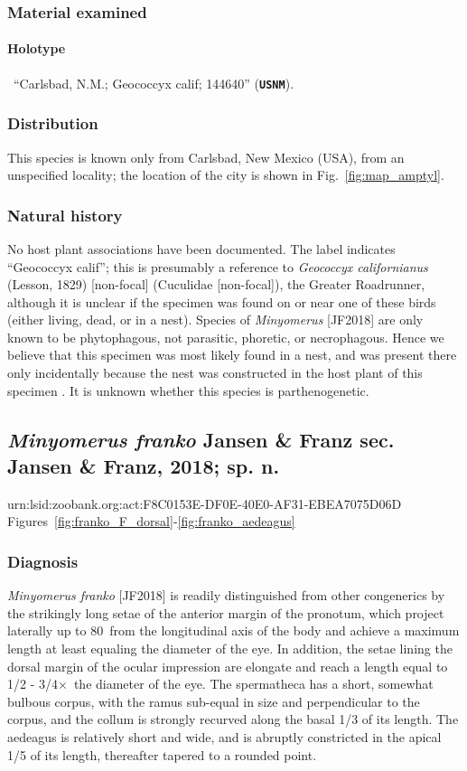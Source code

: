 \documentclass[fleqn,10pt,lineno]{wlpeerj} %
\newcommand{\td}{\textdegree~}
\newcommand{\x}{$\times$~}
\begin{document}
		\subsubsection*{Material examined}
			\paragraph{Holotype}
				\female~``Carlsbad, N.M.; Geococcyx calif; 144640'' (\texttt{\textbf{USNM}}).
		\subsubsection*{Distribution}
			This species is known only from Carlsbad, New Mexico (USA), from an unspecified locality; the location of the city is shown in Fig.~\ref{fig:map_amptyl}.
		\subsubsection*{Natural history}
			No host plant associations have been documented.
			The label indicates ``Geococcyx calif''; this is presumably a reference to \textit{Geococcyx californianus} (Lesson, 1829) [non-focal] (Cuculidae [non-focal]), the Greater Roadrunner, although it is unclear if the specimen was found on or near one of these birds (either living, dead, or in a nest).
			Species of \textit{Minyomerus} [JF2018] are only known to be phytophagous, not parasitic, phoretic, or necrophagous. Hence we believe that this specimen was most likely found in a nest, and was present there only incidentally because the nest was constructed in the host plant of this specimen \citep{jansen2015}.
			It is unknown whether this species is parthenogenetic.
			
	\subsection*{\textit{Minyomerus franko} Jansen \& Franz sec. Jansen \& Franz, 2018; sp. n.}\label{ssec:franko}
		urn:lsid:zoobank.org:act:F8C0153E-DF0E-40E0-AF31-EBEA7075D06D\\
		Figures~\ref{fig:franko_F_dorsal}-\ref{fig:franko_aedeagus}
		\subsubsection*{Diagnosis}
			\textit{Minyomerus franko} [JF2018] is readily distinguished from other congenerics by the strikingly long setae of the anterior margin of the pronotum, which project laterally up to 80\td from the longitudinal axis of the body and achieve a maximum length at least equaling the diameter of the eye.
			In addition, the setae lining the dorsal margin of the ocular impression are elongate and reach a length equal to 1/2 - 3/4\x the diameter of the eye.
			The spermatheca has a short, somewhat bulbous corpus, with the ramus sub-equal in size and perpendicular to the corpus, and the collum is strongly recurved along the basal 1/3 of its length.
			The aedeagus is relatively short and wide, and is abruptly constricted in the apical 1/5 of its length, thereafter tapered to a rounded point.
\end{document}
